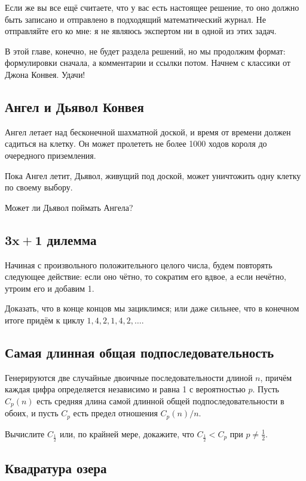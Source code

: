 Если же вы все ещё считаете, что у вас есть настоящее решение, то оно должно быть записано и отправлено в подходящий математический журнал.
Не отправляйте его ко мне: я не являюсь экспертом ни в одной из этих задач.

\medskip

В этой главе, конечно, не будет раздела решений, но мы продолжим формат: формулировки сначала, а комментарии и ссылки потом.
Начнем с классики от Джона Конвея.
Удачи!


\subsection*{Ангел и Дьявол Конвея}

Ангел летает над бесконечной шахматной доской, и время от времени должен садиться на клетку.
Он может пролететь не более 1000 ходов короля до очередного приземления.

Пока Ангел летит, Дьявол, живущий под доской, может уничтожить одну клетку по своему выбору.

Может ли Дьявол поймать Ангела?

\subsection*{$\bm{3x+1}$ дилемма}

Начиная с произвольного положительного целого числа, будем повторять следующее действие: если оно чётно, то сократим его вдвое, а если нечётно, утроим его и добавим 1.

Доказать, что в конце концов мы зациклимся; или даже сильнее, что в конечном итоге придём к циклу $1, 4, 2, 1, 4, 2,\dots$.

\subsection*{Самая длинная общая подпоследовательность}

Генерируются две случайные двоичные последовательности длиной $n$, причём каждая цифра определяется независимо и равна 1 с вероятностью $p$.
Пусть $C_p(n)$ есть средняя длина самой длинной общей подпоследовательности в обоих, и пусть $C_p$ есть предел отношения $C_p(n)/n$.

Вычислите $C_{\frac12}$ или, по крайней мере, докажите, что $C_{\frac12}<C_{p}$ при $p\ne\tfrac12$.

\subsection*{Квадратура озера}

